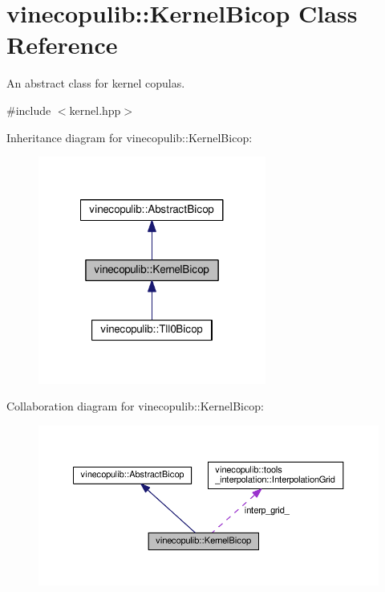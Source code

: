 \hypertarget{classvinecopulib_1_1_kernel_bicop}{\section{vinecopulib\+:\+:Kernel\+Bicop Class Reference}
\label{classvinecopulib_1_1_kernel_bicop}
}


An abstract class for kernel copulas.  




{\ttfamily \#include $<$kernel.\+hpp$>$}



Inheritance diagram for vinecopulib\+:\+:Kernel\+Bicop\+:\nopagebreak
\begin{figure}[H]
\begin{center}
\leavevmode
\includegraphics[width=212pt]{classvinecopulib_1_1_kernel_bicop__inherit__graph}
\end{center}
\end{figure}


Collaboration diagram for vinecopulib\+:\+:Kernel\+Bicop\+:\nopagebreak
\begin{figure}[H]
\begin{center}
\leavevmode
\includegraphics[width=350pt]{classvinecopulib_1_1_kernel_bicop__coll__graph}
\end{center}
\end{figure}
